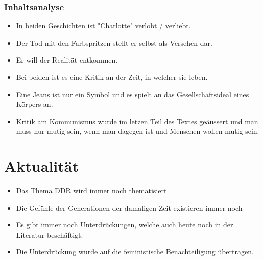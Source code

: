 \documentclass{article}
\begin{document}
\subsubsection{Inhaltsanalyse}
\begin{itemize}[parsep=0pt]
    \item In beiden Geschichten ist "Charlotte" verlobt / verliebt.
    \item Der Tod mit den Farbspritzen stellt er selbst als Versehen dar.
    \item Er will der Realität entkommen.
    \item Bei beiden ist es eine Kritik an der Zeit, in welcher sie leben.
    \item Eine Jeans ist nur ein Symbol und es spielt an das Gesellschaftsideal eines Körpers an.
    \item Kritik am Kommunismus wurde im letzen Teil des Textes geäussert und man muss nur mutig sein, wenn man dagegen ist und Menschen wollen mutig sein.
\end{itemize}




\section{Aktualität}
\begin{itemize}[parsep=0pt]
    \item Das Thema DDR wird immer noch thematisiert
    \item Die Gefühle der Generationen der damaligen Zeit existieren immer noch
    \item Es gibt immer noch Unterdrückungen, welche auch heute noch in der Literatur beschäftigt.
    \item Die Unterdrückung wurde auf die feministische Benachteiligung übertragen.
\end{itemize}
\end{document}
